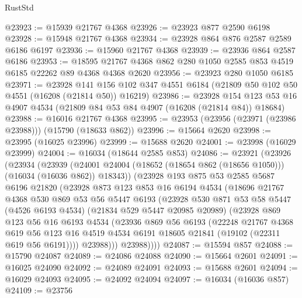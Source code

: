 \begin{lexlean}{RustStd}
\begin{coremodule}
@23923 := @15939 @21767 @4368
@23926 := @23923 @877 @2590 @6198
@23928 := @15948 @21767 @4368
@23934 := @23928 @864 @876 @2587 @2589 @6186 @6197
@23936 := @15960 @21767 @4368
@23939 := @23936 @864 @2587 @6186
@23953 := @18595 @21767 @4368 @862 @280 @1050 @2585 @853 @4519 @6185 @22262 @89 @4368 @4368 @2620
@23956 := @23923 @280 @1050 @6185
@23971 := @23928
    @141
    @156
    @102
    @347
    @4551
    @6184
    (@21809 @50 @102 @50 @4551 (@16208 (@21814 @50)) @16219)
@23986 := @23928
    @154
    @123
    @53
    @16
    @4907
    @4534
    (@21809 @84 @53 @84 @4907 (@16208 (@21814 @84)) @18684)
@23988 := @16016 @21767 @4368
@23995 := @23953 (@23956 (@23971 (@23986 @23988))) (@15790 (@18633 @862))
@23996 := @15664 @2620
@23998 := @23995 (@16025 @23996)
@23999 := @15688 @2620
@24001 := @23998 (@16029 @23999)
@24004 := @16034 (@18644 @2585 @853)
@24086 := @23921
    (@23926
      (@23934
        (@23939 (@24001 @24004 (@18652 (@18654 @862 (@18656 @1050))) (@16034 (@16036 @862)) @18343))
        (@23928
          @193
          @875
          @53
          @2585
          @5687
          @6196
          @21820
          (@23928
            @873
            @123
            @853
            @16
            @6194
            @4534
            (@18696
              @21767
              @4368
              @530
              @869
              @53
              @56
              @5447
              @6193
              (@23928
                @530
                @871
                @53
                @58
                @5447
                (@4526 @6193 @4534)
                (@21834 @529 @5447 @20985 @20989)
                (@23928
                  @869
                  @123
                  @56
                  @16
                  @6193
                  @4534
                  (@23936
                    @869
                    @56
                    @6193
                    (@22248
                      @21767
                      @4368
                      @619
                      @56
                      @123
                      @16
                      @4519
                      @4534
                      @6191
                      @18605
                      @21841
                      (@19102 (@22311 @619 @56 @6191))))
                  @23988)))
            @23988))))
@24087 := @15594 @857
@24088 := @15790 @24087
@24089 := @24086 @24088
@24090 := @15664 @2601
@24091 := @16025 @24090
@24092 := @24089 @24091
@24093 := @15688 @2601
@24094 := @16029 @24093
@24095 := @24092 @24094
@24097 := @16034 (@16036 @857)
@24109 := @23756

\end{coremodule}
\end{lexlean}

